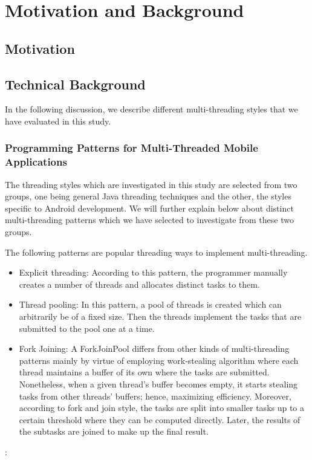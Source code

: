 \documentclass[conference,10pt]{IEEEtran}
\begin{document}
\section{Motivation and Background} 
\subsection{Motivation}

\subsection{Technical Background}
In the following discussion, we describe different multi-threading styles that we have evaluated in this study.

\subsubsection{Programming Patterns for Multi-Threaded Mobile Applications}

The threading styles which are investigated in this study are selected from two groups, one being general Java threading techniques and the other, the styles specific to Android development. We will further explain below about distinct multi-threading patterns which we have selected to investigate from these two groups. 

The following patterns are popular threading ways to implement multi-threading.
\begin{itemize}
	\item Explicit threading: According to this pattern, the programmer manually creates a number of threads and allocates distinct tasks to them. 
	\item Thread pooling: In this pattern, a pool of threads is created which can arbitrarily be of a fixed size. Then the threads implement the tasks that are submitted to the pool one at a time.
	\item Fork Joining: A ForkJoinPool differs from other kinds of multi-threading patterns mainly by virtue of employing work-stealing algorithm where each thread maintains a buffer of its own where the tasks are submitted. Nonetheless, when a given thread’s buffer becomes empty, it starts stealing tasks from other threads’ buffers; hence, maximizing efficiency. Moreover, according to fork and join style, the tasks are split into smaller tasks up to a certain threshold where they can be computed directly. Later, the results of the subtasks are joined to make up the final result.
\end{itemize}: 
\end{document}
